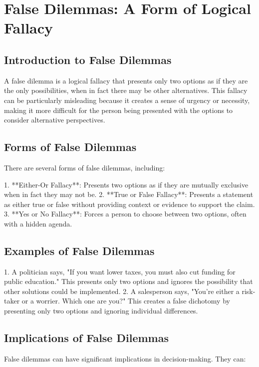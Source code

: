 \chapter{False Dilemmas: A Form of Logical Fallacy}

\section{Introduction to False Dilemmas}

A false dilemma is a logical fallacy that presents only two options as if they are the only possibilities, when in fact there may be other alternatives. This fallacy can be particularly misleading because it creates a sense of urgency or necessity, making it more difficult for the person being presented with the options to consider alternative perspectives.

\section{Forms of False Dilemmas}

There are several forms of false dilemmas, including:

1. **Either-Or Fallacy**: Presents two options as if they are mutually exclusive when in fact they may not be.
2. **True or False Fallacy**: Presents a statement as either true or false without providing context or evidence to support the claim.
3. **Yes or No Fallacy**: Forces a person to choose between two options, often with a hidden agenda.

\section{Examples of False Dilemmas}

1. A politician says, "If you want lower taxes, you must also cut funding for public education." This presents only two options and ignores the possibility that other solutions could be implemented.
2. A salesperson says, "You're either a risk-taker or a worrier. Which one are you?" This creates a false dichotomy by presenting only two options and ignoring individual differences.

\section{Implications of False Dilemmas}

False dilemmas can have significant implications in decision-making. They can:

